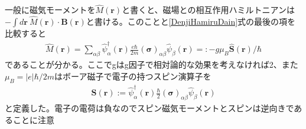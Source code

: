\documentclass[dvipdfmx, 11pt, a4paper]{jsarticle}
\theoremstyle{definition}
\numberwithin{equation}{section}
\begin{document}
    一般に磁気モーメントを$\hat{M}(\bm{r})$と書くと、磁場との相互作用ハミルトニアンは$-\int d\bm{r}\ \hat{M}(\bm{r})\cdot \bm{B}(\bm{r})$と書ける。このことと\eqref{DenjiHamiruDain}式の最後の項を比較すると
    \begin{align}
        \hat{M}(\bm{r}) = \sum_{\alpha \beta} \hat{\psi}^\dagger_{\alpha} (\bm{r})\frac{e\hbar}{2m} (\bm{\sigma})_{\alpha \beta} \hat{\psi}_{\beta}(\bm{r}) =: -g\mu_B \hat{\bm{S}}(\bm{r}) / \hbar 
    \end{align}
    であることが分かる。ここでgはg因子で相対論的な効果を考えなければ2、また$\mu_B=|e|\hbar / 2m$はボーア磁子で電子の持つスピン演算子を
    \begin{align}
        \hat{\bm{S}}(\bm{r}) := \hat{\psi}^\dagger_{\alpha}(\bm{r}) \frac{\hbar}{2}(\bm{\sigma})_{\alpha \beta} \hat{\psi}_\beta(\bm{r})
    \end{align}
    と定義した。電子の電荷は負なのでスピン磁気モーメントとスピンは逆向きであることに注意
\end{document}
